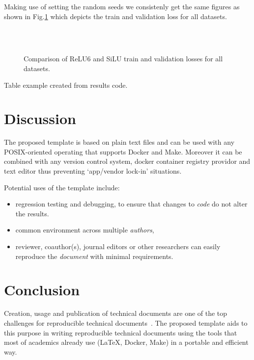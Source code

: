 \documentclass[journal]{IEEEtran}
\begin{document}
Making use of setting the random seeds we consistenly get the same figures as shown in Fig.\ref{fig:image} which depicts the train and validation loss for all datasets.
\begin{figure}[!t]
	\\
	\\
	\caption{Comparison of ReLU6 and SiLU train and validation losses for all datasets.}
	\label{fig:image}
\end{figure}

\begin{table}[h]
	\centering
	\caption{Table example created from results code.}
	\label{table:table}
	\setlength\tabcolsep{2pt}
	
\end{table}

\section{Discussion}
The proposed template is based on plain text files and can be used with any POSIX-oriented operating that supports Docker and Make.
Moreover it can be combined with any version control system, docker container registry providor and text editor thus preventing `app/vendor lock-in' situations.

Potential uses of the template include:
\begin{itemize}
	\item regression testing and debugging, to ensure that changes to \textit{code} do not alter the results.
	\item common environment across multiple \textit{authors},
	\item reviewer, coauthor(s), journal editors or other researchers can easily reproduce the \textit{document} with minimal requirements.
\end{itemize}

\section{Conclusion}
Creation, usage and publication of technical documents are one of the top challenges for reproducible technical documents~\cite{barba2019praxis}.
The proposed template aids to this purpose in writing reproducible technical documents using the tools that most of academics already use (\LaTeX, Docker, Make) in a portable and efficient way.



\end{document}
